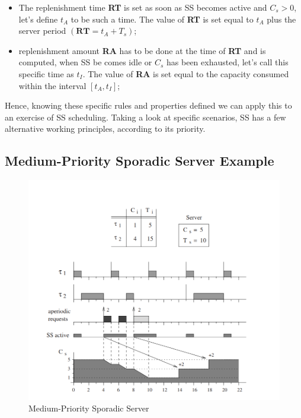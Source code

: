 \documentclass[conference]{IEEEtran}
\begin{document}
\begin{itemize}
    \item The replenishment time \textbf{RT} is set as soon as SS becomes active and $C_s > 0$, let's define $t_A$ to be such a time. The value of \textbf{RT} is set equal to $t_A$ plus the server period $(\textbf{RT} = t_A + T_s)$;
    \item  replenishment amount \textbf{RA} has to be done at the time of \textbf{RT} and is computed, when SS be comes idle or $C_s$ has been exhausted, let's call this specific time as $t_I$. The value of \textbf{RA} is set equal to the capacity consumed within the interval $[t_A, t_I]$;
\end{itemize}

Hence, knowing these specific rules and properties defined we can apply this to an exercise of SS scheduling. Taking a look at specific scenarios, SS has a few alternative working principles, according to its priority.

\subsection{Medium-Priority Sporadic Server Example}

\begin{figure}[htbp]
\centerline{\includegraphics[scale=.38]{Example1.png}}
\caption{Medium-Priority Sporadic Server}
\label{example1}
\end{figure}
\end{document}
